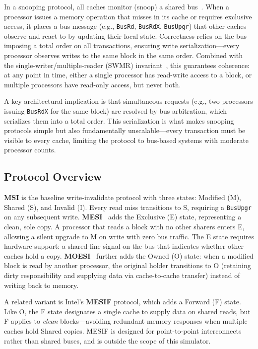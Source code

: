 \documentclass[10pt,twocolumn]{article}
\begin{document}
In a snooping protocol, all caches monitor (snoop) a shared bus~\cite{stenstrom1990survey}. When a processor issues a memory operation that misses in its cache or requires exclusive access, it places a bus message (e.g., \texttt{BusRd}, \texttt{BusRdX}, \texttt{BusUpgr}) that other caches observe and react to by updating their local state. Correctness relies on the bus imposing a total order on all transactions, ensuring write serialization---every processor observes writes to the same block in the same order. Combined with the single-writer/multiple-reader (SWMR) invariant~\cite{sorin2011primer}, this guarantees coherence: at any point in time, either a single processor has read-write access to a block, or multiple processors have read-only access, but never both.

A key architectural implication is that simultaneous requests (e.g., two processors issuing \texttt{BusRdX} for the same block) are resolved by bus arbitration, which serializes them into a total order. This serialization is what makes snooping protocols simple but also fundamentally unscalable---every transaction must be visible to every cache, limiting the protocol to bus-based systems with moderate processor counts.

\subsection{Protocol Overview}

\textbf{MSI} is the baseline write-invalidate protocol with three states: Modified (M), Shared (S), and Invalid (I). Every read miss transitions to S, requiring a \texttt{BusUpgr} on any subsequent write. \textbf{MESI}~\cite{papamarcos1984mesi} adds the Exclusive (E) state, representing a clean, sole copy. A processor that reads a block with no other sharers enters E, allowing a silent upgrade to M on write with zero bus traffic. The E state requires hardware support: a shared-line signal on the bus that indicates whether other caches hold a copy. \textbf{MOESI}~\cite{sweazey1986moesi} further adds the Owned (O) state: when a modified block is read by another processor, the original holder transitions to O (retaining dirty responsibility and supplying data via cache-to-cache transfer) instead of writing back to memory.

A related variant is Intel's \textbf{MESIF} protocol, which adds a Forward (F) state. Like O, the F state designates a single cache to supply data on shared reads, but F applies to \emph{clean} blocks---avoiding redundant memory responses when multiple caches hold Shared copies. MESIF is designed for point-to-point interconnects rather than shared buses, and is outside the scope of this simulator.
\end{document}
